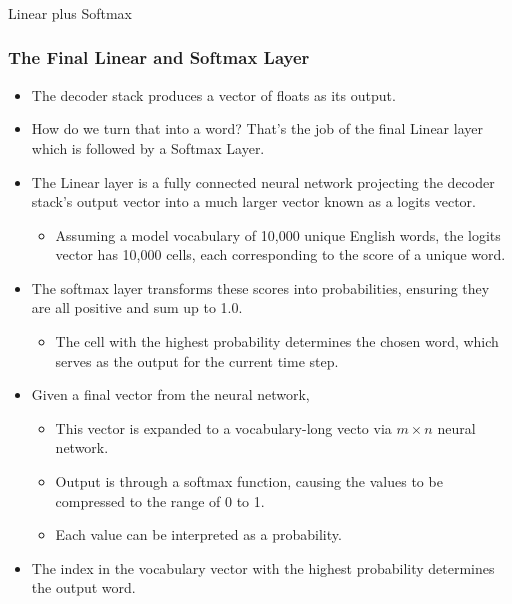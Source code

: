 \begin{frame}[fragile]\frametitle{}
\begin{center}
{\Large Linear plus Softmax}
\end{center}
\end{frame}

\begin{frame}[fragile]\frametitle{The Final Linear and Softmax Layer}

\begin{itemize}
  \item The decoder stack produces a vector of floats as its output.
  \item How do we turn that into a word? That’s the job of the final Linear layer which is followed by a Softmax Layer.
  \item The Linear layer is a fully connected neural network projecting the decoder stack's output vector into a much larger vector known as a logits vector.
    \begin{itemize}
      \item Assuming a model vocabulary of 10,000 unique English words, the logits vector has 10,000 cells, each corresponding to the score of a unique word.
    \end{itemize}
  \item The softmax layer transforms these scores into probabilities, ensuring they are all positive and sum up to 1.0.
    \begin{itemize}
      \item The cell with the highest probability determines the chosen word, which serves as the output for the current time step.
    \end{itemize}
  \item Given a final vector from the neural network,
    \begin{itemize}
      \item This vector is expanded to a vocabulary-long vecto via $ m \times n$ neural network.
      \item Output is through a softmax function, causing the values to be compressed to the range of 0 to 1.
      \item Each value can be interpreted as a probability.
    \end{itemize}
  \item The index in the vocabulary vector with the highest probability determines the output word.
	
\end{itemize}
\end{frame}

